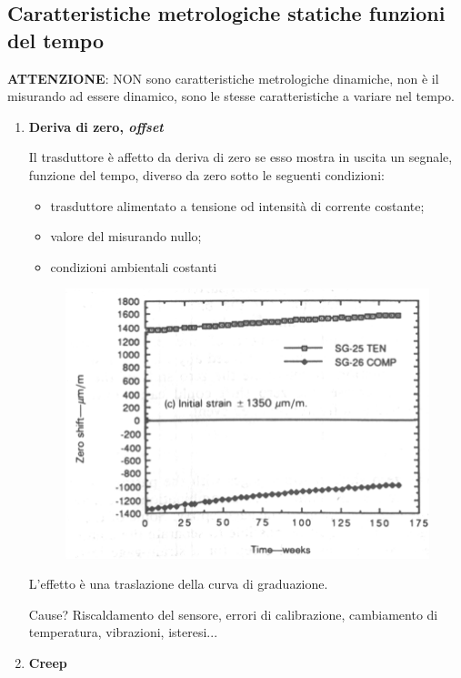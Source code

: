 \documentclass[a4paper, 15pt]{article}
\begin{document}
\subsection{Caratteristiche metrologiche statiche funzioni del tempo}	
\begin{adjustwidth}{2in}{}
	\textbf{ATTENZIONE}: NON sono caratteristiche metrologiche dinamiche, non è il misurando ad essere dinamico, sono le stesse caratteristiche a variare nel tempo. 

\begin{enumerate}
\item \textbf{Deriva di zero, \textit{offset}} 
 	
	Il trasduttore è affetto da deriva di zero se esso mostra in uscita un segnale,
	funzione del tempo, diverso da zero sotto le seguenti condizioni:
\begin{itemize}
	\item trasduttore alimentato a tensione od intensità di corrente costante;
	\item valore del misurando nullo;
	\item condizioni ambientali costanti
\end{itemize}

\begin{figure}[H]
	\centering
	\includegraphics[width=0.5\linewidth]{fig/screenshot023}
	\label{fig:screenshot023}
\end{figure}


 L’effetto è una traslazione della curva di graduazione. 
 
  Cause? Riscaldamento del sensore, errori di calibrazione, cambiamento di temperatura, vibrazioni, isteresi...
 
 \item \textbf{Creep} 
  	

\end{enumerate}
\end{adjustwidth}
\end{document}
